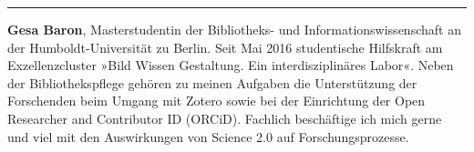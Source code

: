 \begin{center}\rule{0.5\linewidth}{\linethickness}\end{center}

\textbf{Gesa Baron}, Masterstudentin der Bibliotheks- und
Informationswissenschaft an der Humboldt-Universität zu Berlin. Seit Mai
2016 studentische Hilfskraft am Exzellenzcluster »Bild Wissen
Gestaltung. Ein interdisziplinäres Labor«. Neben der Bibliothekspflege
gehören zu meinen Aufgaben die Unterstützung der Forschenden beim Umgang
mit Zotero sowie bei der Einrichtung der Open Researcher and Contributor
ID (ORCiD). Fachlich beschäftige ich mich gerne und viel mit den
Auswirkungen von Science 2.0 auf Forschungsprozesse.
